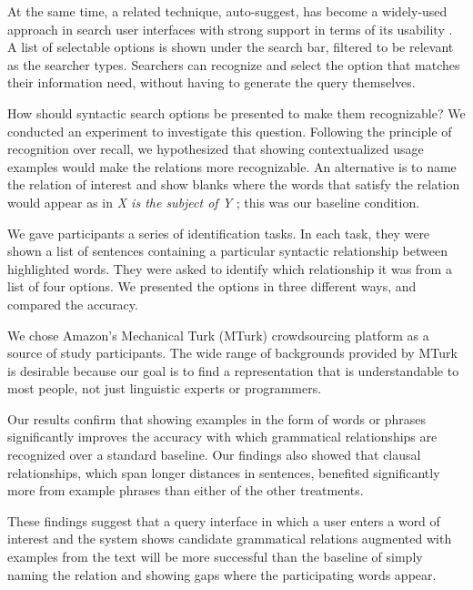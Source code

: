 At the same time, a related technique, auto-suggest, has become a widely-used approach in search user interfaces with strong support in terms of its usability \cite{hearst2009search}. A list of selectable options is shown under the search bar, filtered to be relevant as the searcher types. Searchers can recognize and select the option that matches their information need, without having to generate the query themselves.

How should syntactic search options be presented to make them recognizable? We conducted an experiment to investigate this question. Following the principle of recognition over recall, we hypothesized that showing contextualized usage examples would make the relations more recognizable. An alternative is to name the relation of interest and show blanks where the words that satisfy the relation would appear as in \emph{X is the subject of Y} \cite{muralidharan2013supporting}; this was our baseline condition.

We gave participants a series of identification tasks. In each task, they were shown a list of sentences containing a particular syntactic relationship between highlighted words. They were asked to identify which relationship it was from a list of four options. We presented the options in three different ways, and compared the accuracy.

We chose Amazon's Mechanical Turk (MTurk) crowdsourcing platform as a source of study participants. The wide range of backgrounds provided by MTurk is desirable because our goal is to find a representation that is understandable to most people, not just linguistic experts or programmers.

Our results confirm that showing examples in the form of words or phrases significantly improves the accuracy with which grammatical relationships are recognized over a standard baseline.  Our findings also showed that clausal relationships, which span longer distances in sentences, benefited significantly more from example phrases than either of the other treatments.

These findings suggest that a query interface in which a user enters a word of interest and the system shows candidate grammatical relations augmented with examples from the text will be more successful than the baseline of simply naming the relation and showing gaps where the participating words appear.

